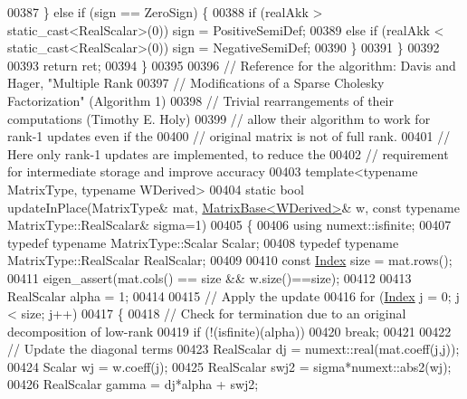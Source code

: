 \begin{DoxyCode}
00387       \} \textcolor{keywordflow}{else} \textcolor{keywordflow}{if} (sign == ZeroSign) \{
00388         \textcolor{keywordflow}{if} (realAkk > static\_cast<RealScalar>(0)) sign = PositiveSemiDef;
00389         \textcolor{keywordflow}{else} \textcolor{keywordflow}{if} (realAkk < static\_cast<RealScalar>(0)) sign = NegativeSemiDef;
00390       \}
00391     \}
00392 
00393     \textcolor{keywordflow}{return} ret;
00394   \}
00395 
00396   \textcolor{comment}{// Reference for the algorithm: Davis and Hager, "Multiple Rank}
00397   \textcolor{comment}{// Modifications of a Sparse Cholesky Factorization" (Algorithm 1)}
00398   \textcolor{comment}{// Trivial rearrangements of their computations (Timothy E. Holy)}
00399   \textcolor{comment}{// allow their algorithm to work for rank-1 updates even if the}
00400   \textcolor{comment}{// original matrix is not of full rank.}
00401   \textcolor{comment}{// Here only rank-1 updates are implemented, to reduce the}
00402   \textcolor{comment}{// requirement for intermediate storage and improve accuracy}
00403   \textcolor{keyword}{template}<\textcolor{keyword}{typename} MatrixType, \textcolor{keyword}{typename} WDerived>
00404   \textcolor{keyword}{static} \textcolor{keywordtype}{bool} updateInPlace(MatrixType& mat, \hyperlink{group___core___module_class_eigen_1_1_matrix_base}{MatrixBase<WDerived>}& w, \textcolor{keyword}{const} \textcolor{keyword}{typename} 
      MatrixType::RealScalar& sigma=1)
00405   \{
00406     \textcolor{keyword}{using} numext::isfinite;
00407     \textcolor{keyword}{typedef} \textcolor{keyword}{typename} MatrixType::Scalar Scalar;
00408     \textcolor{keyword}{typedef} \textcolor{keyword}{typename} MatrixType::RealScalar RealScalar;
00409 
00410     \textcolor{keyword}{const} \hyperlink{namespace_eigen_a62e77e0933482dafde8fe197d9a2cfde}{Index} size = mat.rows();
00411     eigen\_assert(mat.cols() == size && w.size()==size);
00412 
00413     RealScalar alpha = 1;
00414 
00415     \textcolor{comment}{// Apply the update}
00416     \textcolor{keywordflow}{for} (\hyperlink{namespace_eigen_a62e77e0933482dafde8fe197d9a2cfde}{Index} j = 0; j < size; j++)
00417     \{
00418       \textcolor{comment}{// Check for termination due to an original decomposition of low-rank}
00419       \textcolor{keywordflow}{if} (!(isfinite)(alpha))
00420         \textcolor{keywordflow}{break};
00421 
00422       \textcolor{comment}{// Update the diagonal terms}
00423       RealScalar dj = numext::real(mat.coeff(j,j));
00424       Scalar wj = w.coeff(j);
00425       RealScalar swj2 = sigma*numext::abs2(wj);
00426       RealScalar gamma = dj*alpha + swj2;

\end{DoxyCode}
